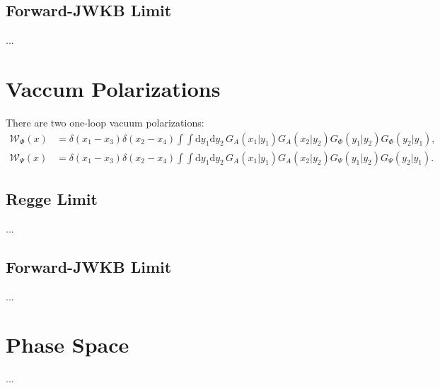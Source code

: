 \subsection{Forward-JWKB Limit}
...
\section{Vaccum Polarizations}
There are two one-loop vacuum polarizations:
\begin{align}
	\mathcal{W}_{\Phi}(x) &= \delta(x_{1} - x_{3}) \delta(x_{2} - x_{4}) \int \int \mathrm{d}y_{1} \mathrm{d}y_{2} \, G_{A}(x_{1} | y_{1}) G_{A}(x_{2}| y_{2}) G_{\Phi}(y_{1} | y_{2}) G_{\Phi}(y_{2}| y_{1}), \\
	\mathcal{W}_{\Psi}(x) &= \delta(x_{1} - x_{3}) \delta(x_{2} - x_{4}) \int \int \mathrm{d}y_{1} \mathrm{d}y_{2} \, G_{A}(x_{1} | y_{1}) G_{A}(x_{2}| y_{2}) G_{\Psi}(y_{1} | y_{2}) G_{\Psi}(y_{2}| y_{1}).
\end{align}
\subsection{Regge Limit}
...
\subsection{Forward-JWKB Limit}
...
\section{Phase Space}
...